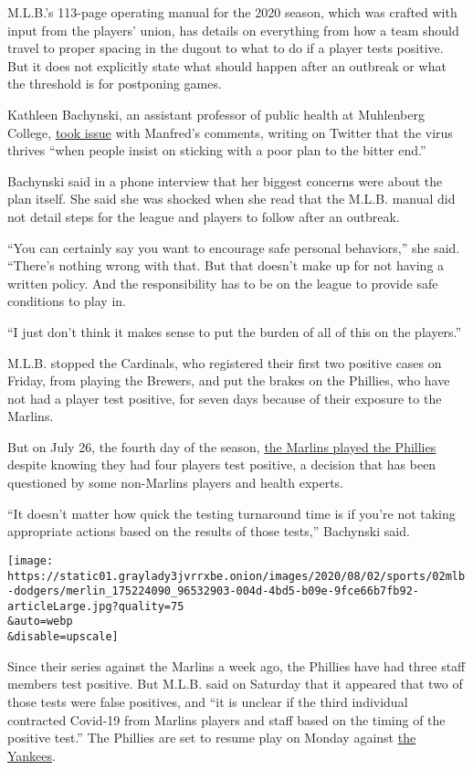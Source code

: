 M.L.B.'s 113-page operating manual for the 2020 season, which was
crafted with input from the players' union, has details on everything
from how a team should travel to proper spacing in the dugout to what to
do if a player tests positive. But it does not explicitly state what
should happen after an outbreak or what the threshold is for postponing
games.

Kathleen Bachynski, an assistant professor of public health at
Muhlenberg College,
\href{https://twitter.com/bachyns/status/1289665507117772800}{took
issue} with Manfred's comments, writing on Twitter that the virus
thrives ``when people insist on sticking with a poor plan to the bitter
end.''

Bachynski said in a phone interview that her biggest concerns were about
the plan itself. She said she was shocked when she read that the M.L.B.
manual did not detail steps for the league and players to follow after
an outbreak.

``You can certainly say you want to encourage safe personal behaviors,''
she said. ``There's nothing wrong with that. But that doesn't make up
for not having a written policy. And the responsibility has to be on the
league to provide safe conditions to play in.

``I just don't think it makes sense to put the burden of all of this on
the players.''

M.L.B. stopped the Cardinals, who registered their first two positive
cases on Friday, from playing the Brewers, and put the brakes on the
Phillies, who have not had a player test positive, for seven days
because of their exposure to the Marlins.

But on July 26, the fourth day of the season,
\href{https://www.nytimes3xbfgragh.onion/2020/07/27/sports/baseball/marlins-game-canceled.html}{the
Marlins played the Phillies} despite knowing they had four players test
positive, a decision that has been questioned by some non-Marlins
players and health experts.

``It doesn't matter how quick the testing turnaround time is if you're
not taking appropriate actions based on the results of those tests,''
Bachynski said.

\texttt{[image: https://static01.graylady3jvrrxbe.onion/images/2020/08/02/sports/02mlb-dodgers/merlin\_175224090\_96532903-004d-4bd5-b09e-9fce66b7fb92-articleLarge.jpg?quality=75\\\&auto=webp\\\&disable=upscale]}

Since their series against the Marlins a week ago, the Phillies have had
three staff members test positive. But M.L.B. said on Saturday that it
appeared that two of those tests were false positives, and ``it is
unclear if the third individual contracted Covid-19 from Marlins players
and staff based on the timing of the positive test.'' The Phillies are
set to resume play on Monday against
\href{https://www.nytimes3xbfgragh.onion/2020/07/29/sports/baseball/yankees-schedule.html}{the
Yankees}.

